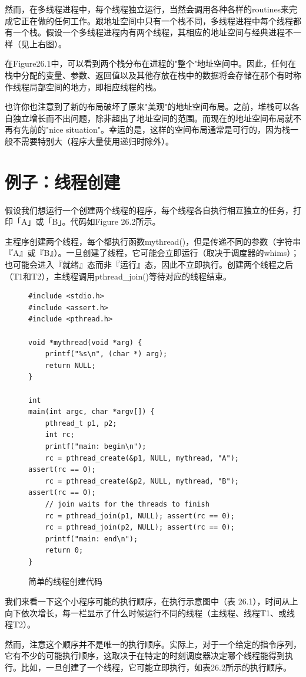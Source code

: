 然而，在多线程进程中，每个线程独立运行，当然会调用各种各样的routines来完成它正在做的任何工作。跟地址空间中只有一个栈不同，多线程进程中每个线程都有一个栈。假设一个多线程进程内有两个线程，其相应的地址空间与经典进程不一样（见上右图）。

在Figure26.1中，可以看到两个栈分布在进程的"整个"地址空间中。因此，任何在栈中分配的变量、参数、返回值以及其他存放在栈中的数据将会存储在那个有时称作线程局部空间的地方，即相应线程的栈。

也许你也注意到了新的布局破坏了原来"美观"的地址空间布局。之前，堆栈可以各自独立增长而不出问题，除非超出了地址空间的范围。而现在的地址空间布局就不再有先前的"nice situation"。幸运的是，这样的空间布局通常是可行的，因为栈一般不需要特别大（程序大量使用递归时除外）。

\section{例子：线程创建}
假设我们想运行一个创建两个线程的程序，每个线程各自执行相互独立的任务，打印「A」或「B」。代码如Figure 26.2所示。

主程序创建两个线程，每个都执行函数mythread()，但是传递不同的参数（字符串『A』或『B』）。一旦创建了线程，它可能会立即运行（取决于调度器的whims）；也可能会进入『就绪』态而非『运行』态，因此不立即执行。创建两个线程之后（T1和T2），主线程调用pthread\_join()等待对应的线程结束。
\begin{figure}[t]
\begin{lstlisting}
#include <stdio.h>
#include <assert.h>
#include <pthread.h>

void *mythread(void *arg) {
    printf("%s\n", (char *) arg);
    return NULL;
}

int
main(int argc, char *argv[]) {
    pthread_t p1, p2;
    int rc;
    printf("main: begin\n");
    rc = pthread_create(&p1, NULL, mythread, "A"); assert(rc == 0);
    rc = pthread_create(&p2, NULL, mythread, "B"); assert(rc == 0);
    // join waits for the threads to finish
    rc = pthread_join(p1, NULL); assert(rc == 0);
    rc = pthread_join(p2, NULL); assert(rc == 0);
    printf("main: end\n");
    return 0;
}
\end{lstlisting}
\caption{简单的线程创建代码}
\end{figure}

我们来看一下这个小程序可能的执行顺序，在执行示意图中（表 26.1），时间从上向下依次增长，每一栏显示了什么时候运行不同的线程（主线程、线程T1、或线程T2）。

然而，注意这个顺序并不是唯一的执行顺序。实际上，对于一个给定的指令序列，它有不少的可能执行顺序，这取决于在特定的时刻调度器决定哪个线程能得到执行。比如，一旦创建了一个线程，它可能立即执行，如表26.2所示的执行顺序。

